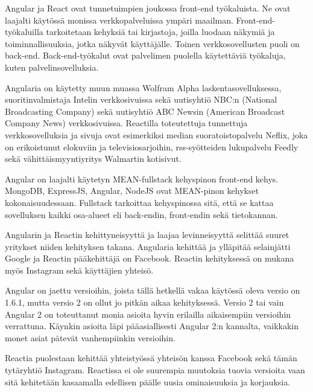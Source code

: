 \documentclass[a4paper,12pt,twoside]{article} %
\begin{document}
\vspace{4mm}\noindent Angular ja React ovat tunnetuimpien joukossa front-end työkaluista. Ne ovat laajalti käytössä monissa verkkopalveluissa ympäri maailman. Front-end-työkaluilla tarkoitetaan kehyksiä tai kirjastoja, joilla luodaan näkymiä ja toiminnallisuuksia, jotka näkyvät käyttäjälle. Toinen verkkosovellusten puoli on back-end. Back-end-työkalut ovat palvelimen puolella käytettäviä työkaluja, kuten palvelinsovelluksia.

\vspace{4mm}\noindent Angularia on käytetty muun muassa Wolfram Alpha laskentasovelluksessa\cite{angularlist}, suoritinvalmistaja Intelin verkkosivuissa sekä uutisyhtiö NBC:n (National Broadcasting Company) sekä uutisyhtiö ABC Newsin (American Broadcast Company News) verkkosivuissa.\cite{angularwikipedia} Reactilla toteutettuja tunnettuja verkkosovelluksia ja sivuja ovat esimerkiksi median suoratoistopalvelu Neflix, joka on erikoistunut elokuviin ja televisiosarjoihin, rss-syötteiden lukupalvelu Feedly sekä vähittäismyyntiyritys Walmartin kotisivut. \cite{reactlist}

\vspace{4mm}\noindent Angular on laajalti käytetyn MEAN-fullstack kehyspinon front-end kehys. MongoDB, ExpressJS, Angular, NodeJS ovat MEAN-pinon kehykset kokonaisuudessaan. Fullstack tarkoittaa kehyspinossa sitä, että se kattaa sovelluksen kaikki osa-alueet eli back-endin, front-endin sekä tietokannan.

\vspace{4mm}\noindent
Angularin ja Reactin kehittyneisyyttä ja laajaa levinneisyyttä selittää suuret yritykset niiden kehityksen takana. Angularia kehittää ja ylläpitää selainjätti Google ja Reactin pääkehittäjä on Facebook. Reactin kehityksessä on mukana myös Instagram sekä käyttäjien yhteisö.

\vspace{4mm}\noindent Angular on jaettu versioihin, joista tällä hetkellä vakaa käytössä oleva versio on 1.6.1, mutta versio 2 on ollut jo pitkän aikaa kehityksessä. Versio 2 tai vain Angular 2 on toteuttanut monia asioita hyvin erilailla aikaisempiin versioihin verrattuna. Käynkin asioita läpi pääasiallisesti Angular 2:n kannalta, vaikkakin monet asiat pätevät vanhempiinkin versioihin.

\vspace{4mm}\noindent
Reactia puolestaan kehittää yhteistyössä yhteisön kanssa Facebook sekä tämän tytäryhtiö Instagram. Reactissa ei ole suurempia muutoksia tuovia versioita vaan sitä kehitetään kasaamalla edellisen päälle uusia ominaisuuksia ja korjauksia.
\end{document}
